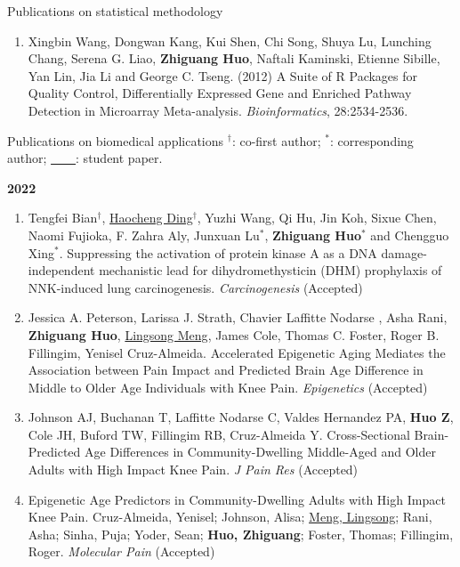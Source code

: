 \documentclass{resume} %
\begin{document}
\begin{rSection}{Publications on statistical methodology}
\begin{enumerate}[noitemsep,topsep=0pt,resume]
    \item Xingbin Wang, Dongwan Kang, Kui Shen, Chi Song, Shuya Lu, Lunching Chang, Serena G. Liao, {\bf Zhiguang Huo}, Naftali Kaminski, Etienne Sibille, Yan Lin, Jia Li and George C. Tseng. (2012) A Suite of R Packages for Quality Control, Differentially Expressed Gene and Enriched Pathway Detection in Microarray Meta-analysis. \emph{Bioinformatics}, 28:2534-2536.

\end{enumerate}


\end{rSection}

\begin{rSection}{Publications on biomedical applications}
$^\dagger$: co-first author; $^*$: corresponding author; \underline{\mbox{ }\mbox{ }\mbox{ }\mbox{ }}: student paper.

\textbf{2022}
\begin{enumerate}[noitemsep,topsep=0pt, resume]

\item
Tengfei Bian$^\dagger$, \underline{Haocheng Ding}$^\dagger$, Yuzhi Wang, Qi Hu, Jin Koh, Sixue Chen, Naomi Fujioka, F. Zahra Aly, Junxuan Lu$^*$, {\bf Zhiguang Huo}$^*$ and Chengguo Xing$^*$.
Suppressing the activation of protein kinase A as a DNA damage-independent mechanistic lead for dihydromethysticin (DHM) prophylaxis of NNK-induced lung carcinogenesis.
\emph{Carcinogenesis} (Accepted)

\item
Jessica A. Peterson, Larissa J. Strath, Chavier Laffitte Nodarse , Asha Rani, {\bf Zhiguang Huo}, \underline{Lingsong Meng}, James Cole, Thomas C. Foster, Roger B. Fillingim, Yenisel Cruz-Almeida. 
Accelerated Epigenetic Aging Mediates the Association between Pain Impact and Predicted Brain Age Difference in Middle to Older Age Individuals with Knee Pain.  
\emph{Epigenetics} (Accepted)

\item  
Johnson AJ, Buchanan T, Laffitte Nodarse C, Valdes Hernandez PA, {\bf Huo Z}, Cole JH, Buford TW, Fillingim RB, Cruz-Almeida Y.
Cross-Sectional Brain-Predicted Age Differences in Community-Dwelling Middle-Aged and Older Adults with High Impact Knee Pain. 
\emph{J Pain Res} (Accepted)

\item Epigenetic Age Predictors in Community-Dwelling Adults with High Impact Knee Pain.
Cruz-Almeida, Yenisel; Johnson, Alisa; \underline{Meng, Lingsong}; Rani, Asha; Sinha, Puja; Yoder, Sean; {\bf Huo, Zhiguang}; Foster, Thomas; Fillingim, Roger.
\emph{Molecular Pain} (Accepted)


\end{enumerate}
\end{rSection}
\end{document}
